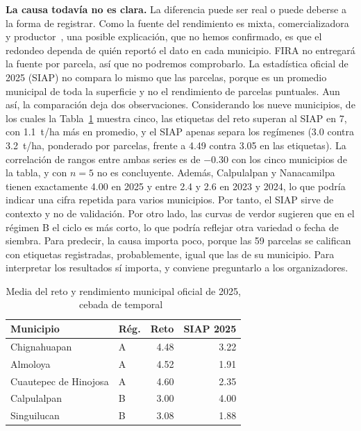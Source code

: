 \textbf{La causa todavía no es clara.} La diferencia puede ser real o puede deberse a la forma de registrar. Como la fuente del rendimiento es mixta, comercializadora y productor~\cite{preguntas}, una posible explicación, que no hemos confirmado, es que el redondeo dependa de quién reportó el dato en cada municipio. FIRA no entregará la fuente por parcela, así que no podremos comprobarlo. La estadística oficial de 2025 (SIAP) no compara lo mismo que las parcelas, porque es un promedio municipal de toda la superficie y no el rendimiento de parcelas puntuales. Aun así, la comparación deja dos observaciones. Considerando los nueve municipios, de los cuales la Tabla~\ref{tab:siap} muestra cinco, las etiquetas del reto superan al SIAP en 7, con 1.1~t/ha más en promedio, y el SIAP apenas separa los regímenes (3.0 contra 3.2~t/ha, ponderado por parcelas, frente a 4.49 contra 3.05 en las etiquetas). La correlación de rangos entre ambas series es de $-0.30$ con los cinco municipios de la tabla, y con $n=5$ no es concluyente. Además, Calpulalpan y Nanacamilpa tienen exactamente 4.00 en 2025 y entre 2.4 y 2.6 en 2023 y 2024, lo que podría indicar una cifra repetida para varios municipios. Por tanto, el SIAP sirve de contexto y no de validación. Por otro lado, las curvas de verdor sugieren que en el régimen B el ciclo es más corto, lo que podría
reflejar otra variedad o fecha de siembra. Para predecir, la causa importa poco, porque las 59 parcelas se califican
con etiquetas registradas, probablemente, igual que las de su municipio. Para interpretar los resultados sí importa, y conviene
preguntarlo a los organizadores.

\begin{table}[!t]
\caption{Media del reto y rendimiento municipal oficial de 2025, cebada de temporal~\cite{siap2026}}\label{tab:siap}
\centering\footnotesize
\begin{tabular}{@{}llrr@{}}
\toprule
Municipio & Rég. & Reto & SIAP 2025 \\
\midrule
Chignahuapan & A & 4.48 & 3.22 \\
Almoloya & A & 4.52 & 1.91 \\
Cuautepec de Hinojosa & A & 4.60 & 2.35 \\
Calpulalpan & B & 3.00 & 4.00 \\
Singuilucan & B & 3.08 & 1.88 \\
\bottomrule
\end{tabular}
\end{table}

